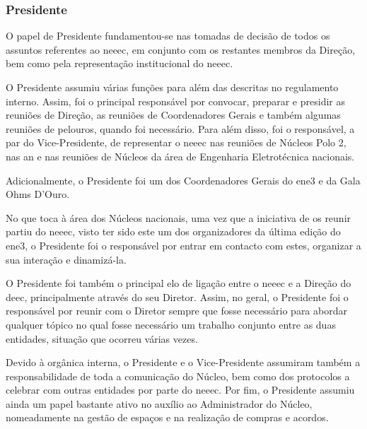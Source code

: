 
\subsubsection{Presidente}

O papel de Presidente fundamentou-se nas tomadas de decisão de todos os assuntos referentes ao \acrshort{neeec}, em conjunto com os restantes membros da Direção, bem como pela representação institucional do \acrshort{neeec}.

O Presidente assumiu várias funções para além das descritas no regulamento interno. Assim, foi o principal responsável por convocar, preparar e presidir as reuniões de Direção, as reuniões de Coordenadores Gerais e também algumas reuniões de pelouros, quando foi necessário. Para além disso, foi o responsável, a par do Vice-Presidente, de representar o \acrshort{neeec} nas reuniões de Núcleos Polo 2, nas \acrshort{an} e nas reuniões de Núcleos da área de Engenharia Eletrotécnica nacionais.

Adicionalmente, o Presidente foi um dos Coordenadores Gerais do \acrshort{ene3} e da Gala Ohms D'Ouro.

No que toca à área dos Núcleos nacionais, uma vez que a iniciativa de os reunir partiu do \acrshort{neeec}, visto ter sido este um dos organizadores da última edição do \acrshort{ene3}, o Presidente foi o responsável por entrar em contacto com estes, organizar a sua interação e dinamizá-la.

O Presidente foi também o principal elo de ligação entre o \acrshort{neeec} e a Direção do \acrshort{deec}, principalmente através do seu Diretor. Assim, no geral, o Presidente foi o responsável por reunir com o Diretor sempre que fosse necessário para abordar qualquer tópico no qual fosse necessário um trabalho conjunto entre as duas entidades, situação que ocorreu várias vezes.

Devido à orgânica interna, o Presidente e o Vice-Presidente assumiram também a responsabilidade de toda a comunicação do Núcleo, bem como dos protocolos a celebrar com outras entidades por parte do \acrshort{neeec}.
Por fim, o Presidente assumiu ainda um papel bastante ativo no auxílio ao Administrador do Núcleo, nomeadamente na gestão de espaços e na realização de compras e acordos.